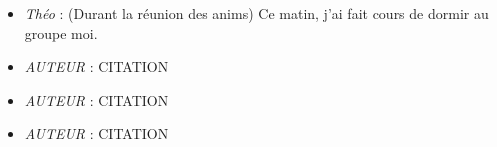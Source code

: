 \setlength{\parindent}{0cm}



\begin{itemize}



\item \textit{Théo} : \og (Durant la réunion des anims) Ce matin, j'ai fait cours de dormir au groupe moi. \fg{}

\item \textit{AUTEUR} : \og CITATION \fg{}

\item \textit{AUTEUR} : \og CITATION \fg{}

\item \textit{AUTEUR} : \og CITATION \fg{}



\end{itemize}